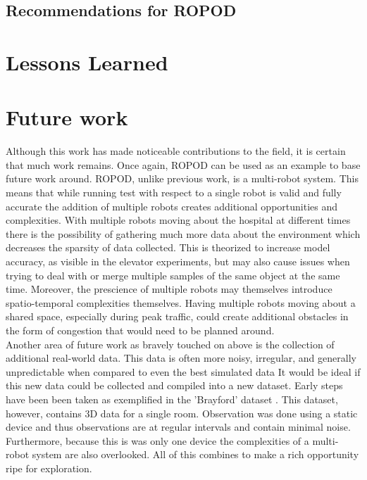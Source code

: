     \subsection{ Recommendations for ROPOD }

    \section{ Lessons Learned }

    \section{ Future work }

    Although this work has made noticeable contributions to the field, it is
    certain that much work remains. Once again, ROPOD can be used as an example
    to base future work around. ROPOD, unlike previous work, is a multi-robot
    system. This means that while running test with respect to a single robot
    is valid and fully accurate the addition of multiple robots creates
    additional opportunities and complexities. With multiple robots moving about
    the hospital at different times there is the possibility of gathering much
    more data about the environment which decreases the sparsity of data
    collected. This is theorized to increase model accuracy, as visible in the
    elevator experiments, but may also cause issues when trying to deal with
    or merge multiple samples of the same object at the same time. Moreover,
    the prescience of multiple robots may themselves introduce spatio-temporal
    complexities themselves. Having multiple robots moving about a shared
    space, especially during peak traffic, could create additional obstacles
    in the form of congestion that would need to be planned around. \\

    Another area of future work as bravely touched on above is the collection
    of additional real-world data. This data is often more noisy, irregular,
    and generally unpredictable when compared to even the best simulated data
    It would be ideal if this new data could be collected and compiled into a
    new dataset. Early steps have been been taken as exemplified in the
    'Brayford' dataset \cite{Krajnik2014}. This dataset, however, contains
    3D data for a single room. Observation was done using a static device and
    thus observations are at regular intervals and contain minimal noise.
    Furthermore, because this is was only one device the complexities of a
    multi-robot system are also overlooked. All of this combines to make a
    rich opportunity ripe for exploration.


